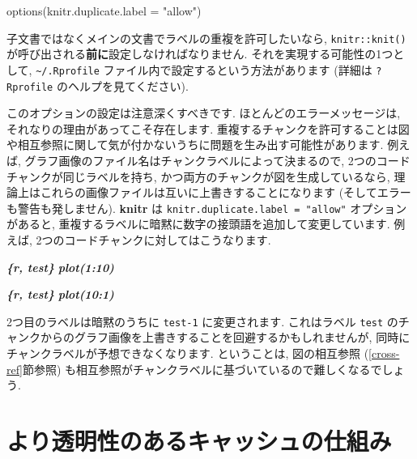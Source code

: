 \documentclass[
  11pt,
  lualatex,
  ja=standard]{bxjsreport}
\newenvironment{Shaded}{\begin{snugshade}}{\end{snugshade}}
\newcommand{\AttributeTok}[1]{\textcolor[rgb]{0.77,0.63,0.00}{#1}}
\newcommand{\FunctionTok}[1]{\textcolor[rgb]{0.00,0.00,0.00}{#1}}
\newcommand{\InformationTok}[1]{\textcolor[rgb]{0.56,0.35,0.01}{\textbf{\textit{#1}}}}
\newcommand{\NormalTok}[1]{#1}
\newcommand{\StringTok}[1]{\textcolor[rgb]{0.31,0.60,0.02}{#1}}
\begin{document}
\begin{Shaded}
\begin{Highlighting}[numbers=left,,]
\FunctionTok{options}\NormalTok{(}\AttributeTok{knitr.duplicate.label =} \StringTok{"allow"}\NormalTok{)}
\end{Highlighting}
\end{Shaded}

子文書ではなくメインの文書でラベルの重複を許可したいなら, \texttt{knitr::knit()} が呼び出される\textbf{前に}設定しなければなりません. それを実現する可能性の1つとして, \texttt{\textasciitilde{}/.Rprofile} ファイル内で設定するという方法があります (詳細は \texttt{?Rprofile} のヘルプを見てください).

このオプションの設定は注意深くすべきです. ほとんどのエラーメッセージは, それなりの理由があってこそ存在します. 重複するチャンクを許可することは図や相互参照に関して気が付かないうちに問題を生み出す可能性があります. 例えば, グラフ画像のファイル名はチャンクラベルによって決まるので, 2つのコードチャンクが同じラベルを持ち, かつ両方のチャンクが図を生成しているなら, 理論上はこれらの画像ファイルは互いに上書きすることになります (そしてエラーも警告も発しません). \textbf{knitr} は \texttt{knitr.duplicate.label = "allow"} オプションがあると, 重複するラベルに暗黙に数字の接頭語を追加して変更しています. 例えば, 2つのコードチャンクに対してはこうなります.

\begin{Shaded}
\begin{Highlighting}[]
\InformationTok{\textasciigrave{}\textasciigrave{}\textasciigrave{}\{r, test\}}
\InformationTok{plot(1:10)}
\InformationTok{\textasciigrave{}\textasciigrave{}\textasciigrave{}}

\InformationTok{\textasciigrave{}\textasciigrave{}\textasciigrave{}\{r, test\}}
\InformationTok{plot(10:1)}
\InformationTok{\textasciigrave{}\textasciigrave{}\textasciigrave{}}
\end{Highlighting}
\end{Shaded}

2つ目のラベルは暗黙のうちに \texttt{test-1} に変更されます. これはラベル \texttt{test} のチャンクからのグラフ画像を上書きすることを回避するかもしれませんが, 同時にチャンクラベルが予想できなくなります. ということは, 図の相互参照 (\ref{cross-ref}節参照) も相互参照がチャンクラベルに基づいているので難しくなるでしょう.

\hypertarget{cache-rds}{%
\section{より透明性のあるキャッシュの仕組み}\label{cache-rds}}
\end{document}
